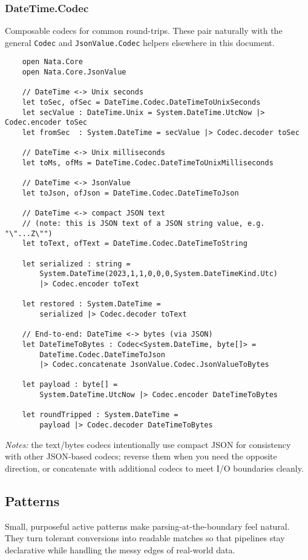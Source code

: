 \documentclass{article}
\begin{document}
\subsubsection{DateTime.Codec}
Composable codecs for common round-trips. These pair naturally with the general \texttt{Codec} and \texttt{JsonValue.Codec} helpers elsewhere in this document.
\begin{verbatim}
    open Nata.Core
    open Nata.Core.JsonValue

    // DateTime <-> Unix seconds
    let toSec, ofSec = DateTime.Codec.DateTimeToUnixSeconds
    let secValue : DateTime.Unix = System.DateTime.UtcNow |> Codec.encoder toSec
    let fromSec  : System.DateTime = secValue |> Codec.decoder toSec

    // DateTime <-> Unix milliseconds
    let toMs, ofMs = DateTime.Codec.DateTimeToUnixMilliseconds

    // DateTime <-> JsonValue
    let toJson, ofJson = DateTime.Codec.DateTimeToJson

    // DateTime <-> compact JSON text
    // (note: this is JSON text of a JSON string value, e.g. "\"...Z\"")
    let toText, ofText = DateTime.Codec.DateTimeToString

    let serialized : string =
        System.DateTime(2023,1,1,0,0,0,System.DateTimeKind.Utc)
        |> Codec.encoder toText

    let restored : System.DateTime =
        serialized |> Codec.decoder toText

    // End-to-end: DateTime <-> bytes (via JSON)
    let DateTimeToBytes : Codec<System.DateTime, byte[]> =
        DateTime.Codec.DateTimeToJson
        |> Codec.concatenate JsonValue.Codec.JsonValueToBytes

    let payload : byte[] =
        System.DateTime.UtcNow |> Codec.encoder DateTimeToBytes

    let roundTripped : System.DateTime =
        payload |> Codec.decoder DateTimeToBytes
\end{verbatim}
\emph{Notes:} the text/bytes codecs intentionally use compact JSON for consistency with other JSON-based codecs; reverse them when you need the opposite direction, or concatenate with additional codecs to meet I/O boundaries cleanly.

\subsection{Patterns}

\noindent Small, purposeful active patterns make parsing-at-the-boundary feel natural. They turn tolerant conversions into readable matches so that pipelines stay declarative while handling the messy edges of real-world data.
\end{document}
